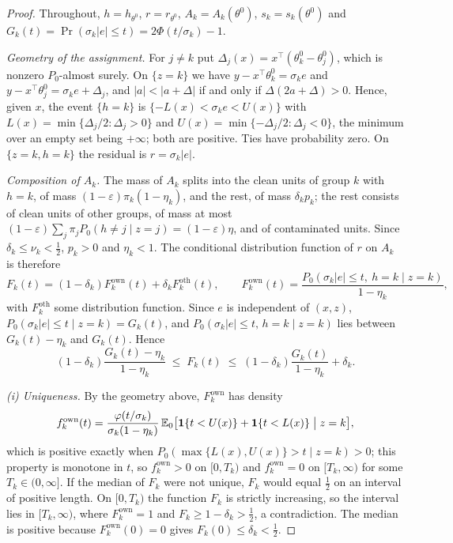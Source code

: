 \begin{proof}
Throughout, $h=h_{\theta^{0}}$, $r=r_{\theta^{0}}$, $A_k=A_k(\theta^{0})$,
$s_k=s_k(\theta^{0})$ and $G_k(t)=\Pr(\sigma_k|e|\le t)=2\Phi(t/\sigma_k)-1$.

\emph{Geometry of the assignment.} For $j\ne k$ put $\Delta_j(x)=x^{\top}(\theta^{0}_k-\theta^{0}_j)$,
which is nonzero $P_0$-almost surely. On $\{z=k\}$ we have $y-x^{\top}\theta^{0}_k=\sigma_ke$
and $y-x^{\top}\theta^{0}_j=\sigma_ke+\Delta_j$, and $|a|<|a+\Delta|$ if and only if
$\Delta(2a+\Delta)>0$. Hence, given $x$, the event $\{h=k\}$ is $\{-L(x)<\sigma_ke<U(x)\}$
with $L(x)=\min\{\Delta_j/2:\Delta_j>0\}$ and $U(x)=\min\{-\Delta_j/2:\Delta_j<0\}$, the
minimum over an empty set being $+\infty$; both are positive. Ties have probability zero.
On $\{z=k,h=k\}$ the residual is $r=\sigma_k|e|$.

\emph{Composition of $A_k$.} The mass of $A_k$ splits into the clean units of group $k$
with $h=k$, of mass $(1-\varepsilon)\pi_k(1-\eta_k)$, and the rest, of mass $\delta_kp_k$; the
rest consists of clean units of other groups, of mass at most
$(1-\varepsilon)\sum_j\pi_jP_0(h\ne j\mid z=j)=(1-\varepsilon)\eta$, and of contaminated
units. Since $\delta_k\le\nu_k<\tfrac12$, $p_k>0$ and $\eta_k<1$. The conditional distribution
function of $r$ on $A_k$ is therefore
\[
F_k(t)=(1-\delta_k)F^{\mathrm{own}}_k(t)+\delta_kF^{\mathrm{oth}}_k(t),\qquad
F^{\mathrm{own}}_k(t)=\frac{P_0(\sigma_k|e|\le t,\ h=k\mid z=k)}{1-\eta_k},
\]
with $F^{\mathrm{oth}}_k$ some distribution function. Since $e$ is independent of $(x,z)$,
$P_0(\sigma_k|e|\le t\mid z=k)=G_k(t)$, and $P_0(\sigma_k|e|\le t,\,h=k\mid z=k)$ lies between
$G_k(t)-\eta_k$ and $G_k(t)$. Hence
\begin{equation}
(1-\delta_k)\frac{G_k(t)-\eta_k}{1-\eta_k}\;\le\;F_k(t)\;\le\;
(1-\delta_k)\frac{G_k(t)}{1-\eta_k}+\delta_k .
\label{eq:adp-sandwich}
\end{equation}

\emph{(i) Uniqueness.} By the geometry above, $F^{\mathrm{own}}_k$ has density
\[
f^{\mathrm{own}}_k(t)=\frac{\varphi(t/\sigma_k)}{\sigma_k(1-\eta_k)}
\,\mathbb{E}_0\bigl[\mathbf{1}\{t<U(x)\}+\mathbf{1}\{t<L(x)\}\bigm|z=k\bigr],
\]
which is positive exactly when $P_0(\max\{L(x),U(x)\}>t\mid z=k)>0$; this property is
monotone in $t$, so $f^{\mathrm{own}}_k>0$ on $[0,T_k)$ and $f^{\mathrm{own}}_k=0$ on
$[T_k,\infty)$ for some $T_k\in(0,\infty]$. If the median of $F_k$ were not unique, $F_k$
would equal $\tfrac12$ on an interval of positive length. On $[0,T_k)$ the function $F_k$
is strictly increasing, so the interval lies in $[T_k,\infty)$, where
$F^{\mathrm{own}}_k=1$ and $F_k\ge1-\delta_k>\tfrac12$, a contradiction. The median is
positive because $F^{\mathrm{own}}_k(0)=0$ gives $F_k(0)\le\delta_k<\tfrac12$.


\end{proof}
